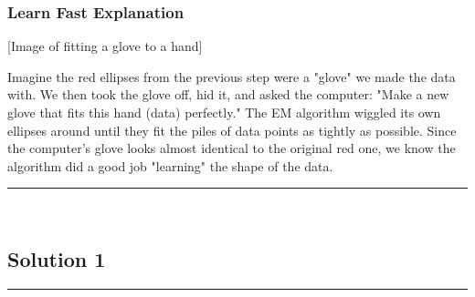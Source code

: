 \documentclass{article}
\begin{document}
\subsubsection*{Learn Fast Explanation}


[Image of fitting a glove to a hand]

Imagine the red ellipses from the previous step were a "glove" we made the data with. We then took the glove off, hid it, and asked the computer: "Make a new glove that fits this hand (data) perfectly."
The EM algorithm wiggled its own ellipses around until they fit the piles of data points as tightly as possible. Since the computer's glove looks almost identical to the original red one, we know the algorithm did a good job "learning" the shape of the data.

\noindent\rule{\textwidth}{0.4pt}\\

\newpage

\subsection*{Solution 1}
\noindent\rule{\textwidth}{0.4pt}\\
\end{document}
